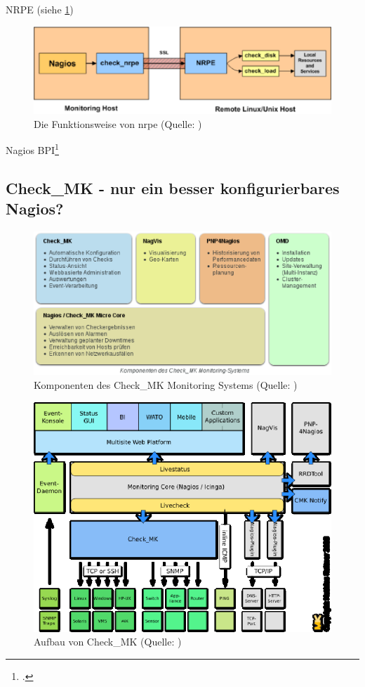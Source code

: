 \documentclass[12pt,a4paper,parskip]{scrreprt}
\begin{document}
	NRPE (siehe \ref{fig:nrpe})
	\begin{figure}[h!]
	\centering
	\includegraphics[width=1\linewidth]{pics/nrpe}
	\caption[Funktionsweise NRPE]{Die Funktionsweise von \acrlong{nrpe} (Quelle: \cite{nagioscoreaddons})}
	\label{fig:nrpe}
	\end{figure}

	
	Nagios BPI\footcite{nagiosbpi}
	
	\subsection{Check\_MK - nur ein besser konfigurierbares Nagios?}
	\begin{figure}[!h]
		\centering
		\includegraphics[width=1\textwidth]{pics/checkMKAufbau.eps}
		\caption[Komponenten des Check\_MK Monitoring Systems]{Komponenten des Check\_MK Monitoring Systems (Quelle: \cite{checkmkmonitoringpic})}
		\label{fig:checkmk}
	\end{figure}
	\begin{figure}[!h]
		\centering
		\includegraphics[width=1\textwidth]{pics/OMD_Schema.eps}
		\caption[Aufbau von Check\_MK]{Aufbau von Check\_MK (Quelle: \cite{checkmk})}
		\label{fig:checkmkaufbau}
	\end{figure}
	\clearpage
	
\end{document}
